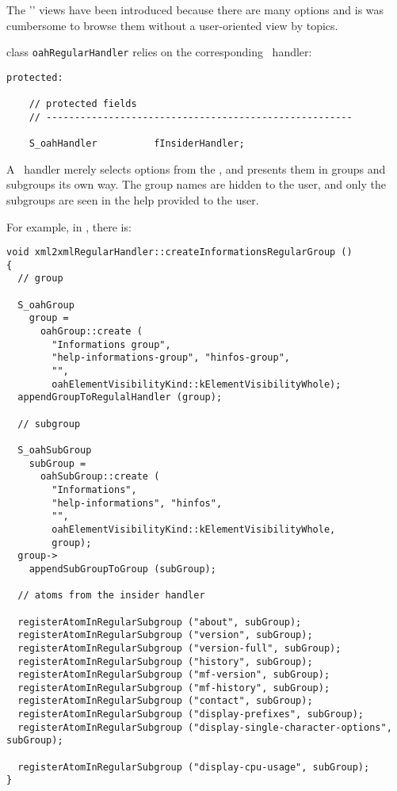 {The '\regular' views have been introduced because there are many options and is was cumbersome to browse them without a user-oriented view by topics.

class   {\tt oahRegularHandler} relies on the corresponding \insider\ handler:
\begin{lstlisting}[language=CPlusPlus]
  protected:

    // protected fields
    // ------------------------------------------------------

    S_oahHandler          fInsiderHandler;
\end{lstlisting}

A \regular\ handler merely selects options from the , and presents them in groups and subgroups its own way. The group names are hidden to the user, and only the subgroups are seen in the help provided to the user.

For example, in , there is:
\begin{lstlisting}[language=CPlusPlus]
void xml2xmlRegularHandler::createInformationsRegularGroup ()
{
  // group

  S_oahGroup
    group =
      oahGroup::create (
        "Informations group",
        "help-informations-group", "hinfos-group",
        "",
        oahElementVisibilityKind::kElementVisibilityWhole);
  appendGroupToRegulalHandler (group);

  // subgroup

  S_oahSubGroup
    subGroup =
      oahSubGroup::create (
        "Informations",
        "help-informations", "hinfos",
        "",
        oahElementVisibilityKind::kElementVisibilityWhole,
        group);
  group->
    appendSubGroupToGroup (subGroup);

  // atoms from the insider handler

  registerAtomInRegularSubgroup ("about", subGroup);
  registerAtomInRegularSubgroup ("version", subGroup);
  registerAtomInRegularSubgroup ("version-full", subGroup);
  registerAtomInRegularSubgroup ("history", subGroup);
  registerAtomInRegularSubgroup ("mf-version", subGroup);
  registerAtomInRegularSubgroup ("mf-history", subGroup);
  registerAtomInRegularSubgroup ("contact", subGroup);
  registerAtomInRegularSubgroup ("display-prefixes", subGroup);
  registerAtomInRegularSubgroup ("display-single-character-options", subGroup);

  registerAtomInRegularSubgroup ("display-cpu-usage", subGroup);
}
\end{lstlisting}


}
